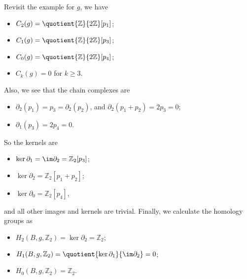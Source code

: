 \begin{eg}
	Revisit the example for \(g\), we have
	\begin{itemize}
		\item \(C_2(g) = \quotient{\mathbb{Z} }{2 \mathbb{Z} } [p_1]\);
		\item \(C_1(g) = \quotient{\mathbb{Z} }{2 \mathbb{Z} } [p_3]\);
		\item \(C_0(g) = \quotient{\mathbb{Z} }{2 \mathbb{Z} } [p_4]\);
		\item \(C_k(g) = 0\) for \(k \geq 3\).
	\end{itemize}
	Also, we see that the chain complexes are
	\begin{itemize}
		\item \(\partial _2 (p_1) = p_3 = \partial _2(p_2)\), and \(\partial _2(p_1 + p_2) = 2 p_3 = 0\);
		\item \(\partial _1 (p_3) = 2 p_4 = 0\).
	\end{itemize}
	So the kernels are
	\begin{itemize}
		\item \(\ker \partial _1 = \im\partial _2 = \mathbb{Z} _2[p_3]\);
		\item \(\ker \partial _2 = \mathbb{Z} _2 [p_1 + p_2]\);
		\item \(\ker \partial _0 = \mathbb{Z} _2[p_4]\),
	\end{itemize}
	and all other images and kernels are trivial. Finally, we calculate the homology groups as
	\begin{itemize}
		\item \(H_2(B , g, \mathbb{Z} _2) = \ker \partial _2 = \mathbb{Z} _2\);
		\item \(H_1(B , g, \mathbb{Z} _2) = \quotient{\ker \partial _1}{\im \partial _2} = 0\);
		\item \(H_0(B , g, \mathbb{Z} _2) = \mathbb{Z} _2\).
	\end{itemize}
\end{eg}